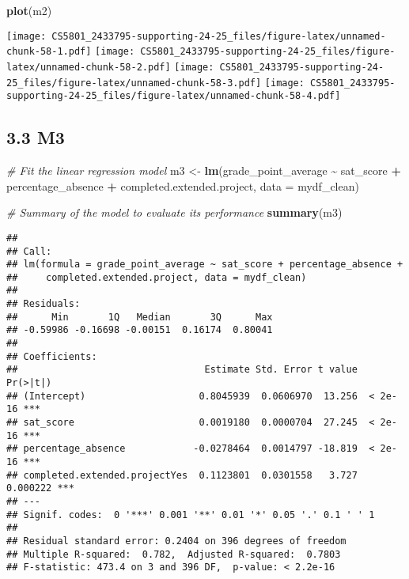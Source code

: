 \documentclass[
]{article}
\newenvironment{Shaded}{\begin{snugshade}}{\end{snugshade}}
\newcommand{\AttributeTok}[1]{\textcolor[rgb]{0.13,0.29,0.53}{#1}}
\newcommand{\CommentTok}[1]{\textcolor[rgb]{0.56,0.35,0.01}{\textit{#1}}}
\newcommand{\FunctionTok}[1]{\textcolor[rgb]{0.13,0.29,0.53}{\textbf{#1}}}
\newcommand{\NormalTok}[1]{#1}
\newcommand{\OtherTok}[1]{\textcolor[rgb]{0.56,0.35,0.01}{#1}}
\newcommand{\SpecialCharTok}[1]{\textcolor[rgb]{0.81,0.36,0.00}{\textbf{#1}}}
\begin{document}
\begin{Shaded}
\begin{Highlighting}[]
\FunctionTok{plot}\NormalTok{(m2)}
\end{Highlighting}
\end{Shaded}

\texttt{[image: CS5801\_2433795-supporting-24-25\_files/figure-latex/unnamed-chunk-58-1.pdf]}
\texttt{[image: CS5801\_2433795-supporting-24-25\_files/figure-latex/unnamed-chunk-58-2.pdf]}
\texttt{[image: CS5801\_2433795-supporting-24-25\_files/figure-latex/unnamed-chunk-58-3.pdf]}
\texttt{[image: CS5801\_2433795-supporting-24-25\_files/figure-latex/unnamed-chunk-58-4.pdf]}

\subsection{3.3 M3}\label{m3}

\begin{Shaded}
\begin{Highlighting}[]
\CommentTok{\# Fit the linear regression model}
\NormalTok{m3 }\OtherTok{\textless{}{-}} \FunctionTok{lm}\NormalTok{(grade\_point\_average }\SpecialCharTok{\textasciitilde{}}\NormalTok{ sat\_score }\SpecialCharTok{+}\NormalTok{ percentage\_absence }\SpecialCharTok{+}\NormalTok{ completed.extended.project, }\AttributeTok{data =}\NormalTok{ mydf\_clean)}

\CommentTok{\# Summary of the model to evaluate its performance}
\FunctionTok{summary}\NormalTok{(m3)}
\end{Highlighting}
\end{Shaded}

\begin{verbatim}
## 
## Call:
## lm(formula = grade_point_average ~ sat_score + percentage_absence + 
##     completed.extended.project, data = mydf_clean)
## 
## Residuals:
##      Min       1Q   Median       3Q      Max 
## -0.59986 -0.16698 -0.00151  0.16174  0.80041 
## 
## Coefficients:
##                                 Estimate Std. Error t value Pr(>|t|)    
## (Intercept)                    0.8045939  0.0606970  13.256  < 2e-16 ***
## sat_score                      0.0019180  0.0000704  27.245  < 2e-16 ***
## percentage_absence            -0.0278464  0.0014797 -18.819  < 2e-16 ***
## completed.extended.projectYes  0.1123801  0.0301558   3.727 0.000222 ***
## ---
## Signif. codes:  0 '***' 0.001 '**' 0.01 '*' 0.05 '.' 0.1 ' ' 1
## 
## Residual standard error: 0.2404 on 396 degrees of freedom
## Multiple R-squared:  0.782,  Adjusted R-squared:  0.7803 
## F-statistic: 473.4 on 3 and 396 DF,  p-value: < 2.2e-16
\end{verbatim}
\end{document}
